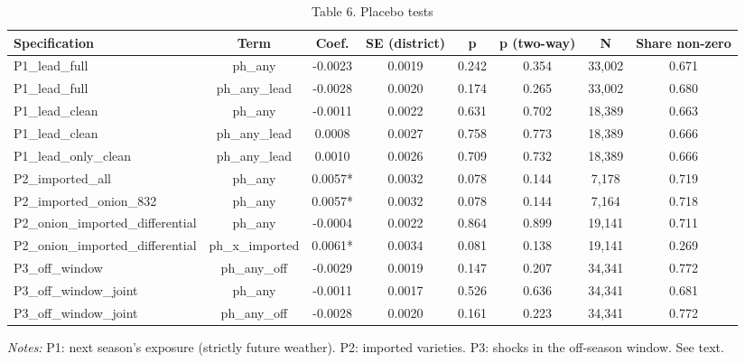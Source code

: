 \begin{table}[htbp]\centering\small
\caption{Table 6. Placebo tests}\label{tab:table6_placebo_tests}
\begin{tabular}{lccccccc}
\toprule
Specification & Term & Coef. & SE (district) & p & p (two-way) & N & Share non-zero \\
\midrule
P1\_lead\_full & ph\_any & -0.0023 & 0.0019 & 0.242 & 0.354 & 33,002 & 0.671 \\
P1\_lead\_full & ph\_any\_lead & -0.0028 & 0.0020 & 0.174 & 0.265 & 33,002 & 0.680 \\
P1\_lead\_clean & ph\_any & -0.0011 & 0.0022 & 0.631 & 0.702 & 18,389 & 0.663 \\
P1\_lead\_clean & ph\_any\_lead & 0.0008 & 0.0027 & 0.758 & 0.773 & 18,389 & 0.666 \\
P1\_lead\_only\_clean & ph\_any\_lead & 0.0010 & 0.0026 & 0.709 & 0.732 & 18,389 & 0.666 \\
P2\_imported\_all & ph\_any & 0.0057* & 0.0032 & 0.078 & 0.144 & 7,178 & 0.719 \\
P2\_imported\_onion\_832 & ph\_any & 0.0057* & 0.0032 & 0.078 & 0.144 & 7,164 & 0.718 \\
P2\_onion\_imported\_differential & ph\_any & -0.0004 & 0.0022 & 0.864 & 0.899 & 19,141 & 0.711 \\
P2\_onion\_imported\_differential & ph\_x\_imported & 0.0061* & 0.0034 & 0.081 & 0.138 & 19,141 & 0.269 \\
P3\_off\_window & ph\_any\_off & -0.0029 & 0.0019 & 0.147 & 0.207 & 34,341 & 0.772 \\
P3\_off\_window\_joint & ph\_any & -0.0011 & 0.0017 & 0.526 & 0.636 & 34,341 & 0.681 \\
P3\_off\_window\_joint & ph\_any\_off & -0.0028 & 0.0020 & 0.161 & 0.223 & 34,341 & 0.772 \\
\bottomrule
\end{tabular}
\begin{minipage}{0.95\linewidth}\footnotesize \textit{Notes:} P1: next season's exposure (strictly future weather). P2: imported varieties. P3: shocks in the off-season window. See text.\end{minipage}
\end{table}